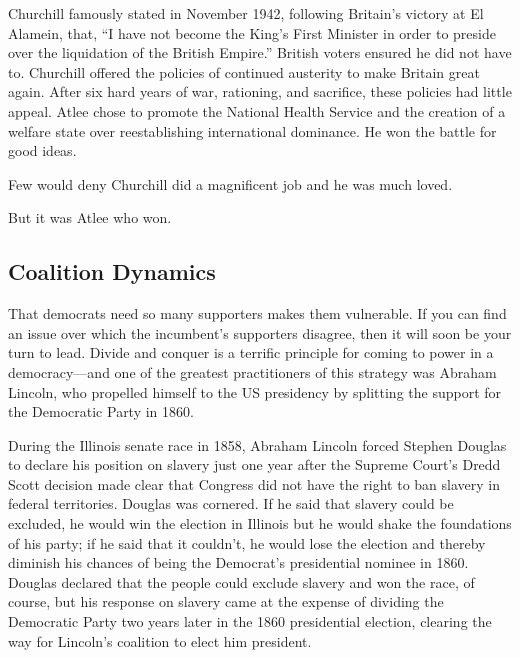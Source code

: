 \documentclass[10pt]{article}
\begin{document}
{\large Churchill famously stated in November 1942, following Britain's victory
at El Alamein, that, ``I have not become the King's First Minister in order to
preside over the liquidation of the British Empire.'' British voters ensured he
did not have to. Churchill offered the policies of continued austerity to make
Britain great again. After six hard years of war, rationing, and sacrifice, these
policies had little appeal. Atlee chose to promote the National Health Service
and the creation of a welfare state over reestablishing international dominance.
He won the battle for good ideas.}

{\large Few would deny Churchill did a magnificent job and he was much loved.}

{\large But it was Atlee who won.}

\subsection{Coalition Dynamics}

{\large That democrats need so many supporters makes them vulnerable. If you can
find an issue over which the incumbent's supporters disagree, then it will soon
be your turn to lead. Divide and conquer is a terrific principle for coming to
power in a democracy---and one of the greatest practitioners of this strategy was
Abraham Lincoln, who propelled himself to the US presidency by splitting the
support for the Democratic Party in 1860.}

{\large During the Illinois senate race in 1858, Abraham Lincoln forced Stephen
Douglas to declare his position on slavery just one year after the Supreme
Court's Dredd Scott decision made clear that Congress did not have the right to
ban slavery in federal territories. Douglas was cornered. If he said that slavery
could be excluded, he would win the election in Illinois but he would shake the
foundations of his party; if he said that it couldn't, he would lose the election
and thereby diminish his chances of being the Democrat's presidential nominee in
1860. Douglas declared that the people could exclude slavery and won the race, of
course, but his response on slavery came at the expense of dividing the
Democratic Party two years later in the 1860 presidential election, clearing the
way for Lincoln's coalition to elect him president.}
\end{document}
